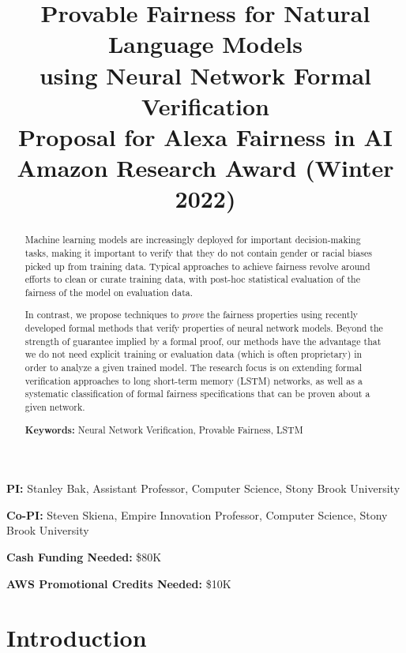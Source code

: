 \documentclass[11pt]{article}
\begin{document}
\title{Provable Fairness for Natural Language Models \\ using Neural Network Formal Verification \\
{\large Proposal for Alexa Fairness in AI Amazon Research Award (Winter 2022)}}
\author{
}
\date{}
\maketitle

\thispagestyle{fancy}

\vspace{-2em}
\noindent
\textbf{PI:} Stanley Bak, Assistant Professor, Computer Science, Stony Brook University

\noindent
\textbf{Co-PI:} Steven Skiena, Empire Innovation Professor, Computer Science, Stony Brook University

\noindent
\textbf{Cash Funding Needed:} \$80K

\noindent
\textbf{AWS Promotional Credits Needed:} \$10K


\begin{abstract}

\noindent
Machine learning models are increasingly deployed for important decision-making tasks, making it important to verify that they do not contain gender or racial biases picked up from training data.
%
Typical approaches to achieve fairness revolve around efforts to clean or curate training data, with post-hoc statistical evaluation of the fairness of the model on evaluation data.

\vspace{1em}
\noindent
In contrast, we propose techniques to \emph{prove} the fairness properties using recently developed formal methods that verify properties of neural network models.
%
Beyond the strength of guarantee implied by a formal proof, our methods have the advantage that we do not need explicit training or evaluation data (which is often proprietary) in order to analyze a given trained model.
%
The research focus is on extending formal verification approaches to long short-term memory (LSTM) networks, as well as a systematic classification of formal fairness specifications that can be proven about a given network.

\vspace{1em}
\noindent
\textbf{Keywords:} Neural Network Verification, Provable Fairness, LSTM
\end{abstract}

\section*{Introduction}
\end{document}
